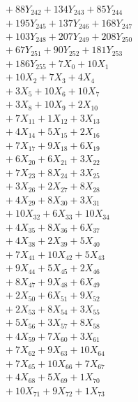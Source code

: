 \documentclass[a4paper,10pt]{article}
\begin{document}
{\begin{align}
&\;  + 88 Y_{242} + 134 Y_{243} + 85 Y_{244} \\[0.3ex]
&\;  + 195 Y_{245} + 137 Y_{246} + 168 Y_{247} \\[0.3ex]
&\;  + 103 Y_{248} + 207 Y_{249} + 208 Y_{250} \\[0.3ex]
&\;  + 67 Y_{251} + 90 Y_{252} + 181 Y_{253} \\[0.3ex]
&\;  + 186 Y_{255} + 7 X_{0} + 10 X_{1} \\[0.3ex]
&\;  + 10 X_{2} + 7 X_{3} + 4 X_{4} \\[0.3ex]
&\;  + 3 X_{5} + 10 X_{6} + 10 X_{7} \\[0.3ex]
&\;  + 3 X_{8} + 10 X_{9} + 2 X_{10} \\[0.3ex]
&\;  + 7 X_{11} + 1 X_{12} + 3 X_{13} \\[0.5ex]\allowbreak
&\;  + 4 X_{14} + 5 X_{15} + 2 X_{16} \\[0.3ex]
&\;  + 7 X_{17} + 9 X_{18} + 6 X_{19} \\[0.3ex]
&\;  + 6 X_{20} + 6 X_{21} + 3 X_{22} \\[0.3ex]
&\;  + 7 X_{23} + 8 X_{24} + 3 X_{25} \\[0.3ex]
&\;  + 3 X_{26} + 2 X_{27} + 8 X_{28} \\[0.3ex]
&\;  + 4 X_{29} + 8 X_{30} + 3 X_{31} \\[0.3ex]
&\;  + 10 X_{32} + 6 X_{33} + 10 X_{34} \\[0.3ex]
&\;  + 4 X_{35} + 8 X_{36} + 6 X_{37} \\[0.3ex]
&\;  + 4 X_{38} + 2 X_{39} + 5 X_{40} \\[0.3ex]
&\;  + 7 X_{41} + 10 X_{42} + 5 X_{43} \\[0.5ex]\allowbreak
&\;  + 9 X_{44} + 5 X_{45} + 2 X_{46} \\[0.3ex]
&\;  + 8 X_{47} + 9 X_{48} + 6 X_{49} \\[0.3ex]
&\;  + 2 X_{50} + 6 X_{51} + 9 X_{52} \\[0.3ex]
&\;  + 2 X_{53} + 8 X_{54} + 3 X_{55} \\[0.3ex]
&\;  + 5 X_{56} + 3 X_{57} + 8 X_{58} \\[0.3ex]
&\;  + 4 X_{59} + 7 X_{60} + 3 X_{61} \\[0.3ex]
&\;  + 7 X_{62} + 9 X_{63} + 10 X_{64} \\[0.3ex]
&\;  + 7 X_{65} + 10 X_{66} + 7 X_{67} \\[0.3ex]
&\;  + 4 X_{68} + 5 X_{69} + 1 X_{70} \\[0.3ex]
&\;  + 10 X_{71} + 9 X_{72} + 1 X_{73} \\[0.5ex]\allowbreak

\end{align}}
\end{document}
